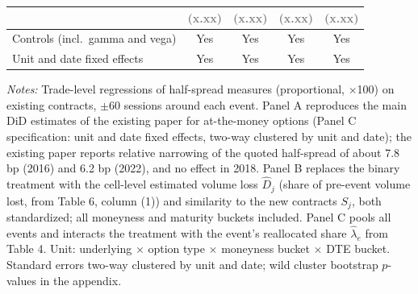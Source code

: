 \documentclass[11pt]{article}
\newcommand{\phse}{\textcolor{gray}{(x.xx)}}
\begin{document}
\begin{table}[H]
\begin{threeparttable}
\begin{tabularx}{\textwidth}{l*{4}{C}}
                                              & \phse & \phse & \phse & \phse \\
\midrule
Controls (incl.\ gamma and vega) & Yes & Yes & Yes & Yes \\
Unit and date fixed effects      & Yes & Yes & Yes & Yes \\
\bottomrule
\end{tabularx}
\begin{tablenotes}
\footnotesize
\item[] \textit{Notes:} Trade-level regressions of half-spread measures (proportional, $\times$100) on existing contracts, $\pm$60 sessions around each event. Panel A reproduces the main DiD estimates of the existing paper for at-the-money options (Panel C specification: unit and date fixed effects, two-way clustered by unit and date); the existing paper reports relative narrowing of the quoted half-spread of about 7.8 bp (2016) and 6.2 bp (2022), and no effect in 2018. Panel B replaces the binary treatment with the cell-level estimated volume loss $\widehat{D}_j$ (share of pre-event volume lost, from Table 6, column (1)) and similarity to the new contracts $S_j$, both standardized; all moneyness and maturity buckets included. Panel C pools all events and interacts the treatment with the event's reallocated share $\hat\lambda_e$ from Table 4. Unit: underlying $\times$ option type $\times$ moneyness bucket $\times$ DTE bucket. Standard errors two-way clustered by unit and date; wild cluster bootstrap $p$-values in the appendix.
\end{tablenotes}
\end{threeparttable}
\end{table}
\end{document}
